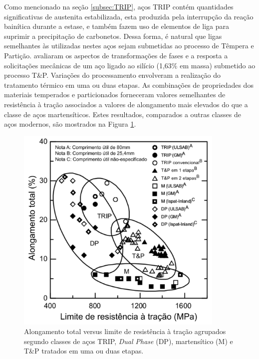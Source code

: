 
Como mencionado na seção \ref{subsec:TRIP}, aços TRIP contém quantidades significativas de austenita estabilizada, esta produzida pela interrupção da reação bainítica durante a estase, e também fazem uso de elementos de liga para suprimir a precipitação de carbonetos. Dessa forma, é natural que ligas semelhantes às utilizadas nestes aços sejam submetidas ao processo de Têmpera e Partição.  %
avaliaram os aspectos de transformações de fases e a resposta a solicitações mecânicas de um aço ligado ao silício (1,63\% em massa) submetido ao processo T\&P. Variações do processamento envolveram a realização do tratamento térmico em uma ou duas etapas. As combinações de propriedades dos materiais temperados e particionados forneceram valores semelhantes de resistência à tração associados a valores de alongamento mais elevados do que a classe de aços martensíticos. Estes resultados, comparados a outras classes de aços modernos, são mostrados na Figura \ref{fig:TRIPQP}.

\begin{figure}
  \includegraphics[height=10cm]{img/Streicher.pdf}
  \caption{Alongamento total versus limite de resistência à tração agrupados segundo classes de aços TRIP, \textit{Dual Phase} (DP), martensítico (M) e T\&P tratados em uma ou duas etapas\cite{Streicher2004}.}
  \label{fig:TRIPQP}
\end{figure}

